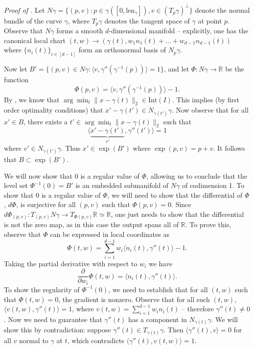 \documentclass[11pt]{article}
\begin{document}
\textit{Proof of .} Let $N\gamma = \{(p, v) : p \in \gamma([0, \text{len}_{\gamma}]), v \in (T_p \gamma)^{\bot}\}$ denote the normal bundle of the curve $\gamma$, where $T_p\gamma$ denotes the tangent space of $\gamma$ at point $p$. Observe that $N\gamma$ forms a smooth $d$-dimensional manifold -- explicitly, one has the canonical local chart $(t,w) \rightarrow (\gamma(t), w_1n_1(t) + \dots+w_{d-1}n_{d-1}(t))$ where $\{n_i(t)\}_{i\in [d-1]}$ form an orthonormal basis of $N_p\gamma$. 

Now let $B'= \{(p,v) \in N\gamma : \langle v,  \gamma''(\gamma^{-1}(p))\rangle = 1\}$, and let $\Phi:N\gamma \rightarrow \mathbb{R}$ be the function
\[\Phi(p,v) = \langle v, \gamma''(\gamma^{-1}(p))\rangle - 1.\]
By , we know that $\arg \min_t\|x - \gamma(t)\|_2 \in \text{Int}(I)$. This implies (by first order optimality conditions) that $x' - \gamma(t') \in N_{\gamma(t')}\gamma$. Now observe that for all $x' \in B$, there exists a $t' \in \arg\min_t \|x-\gamma(t)\|_2$ such that \[\langle \underbrace{x' - \gamma(t')}_{v'}, \gamma''(t')\rangle = 1\] where $v' \in N_{\gamma(t')}\gamma$. Thus $x' \in \exp(B')$ where $\exp(p,v) = p + v$. It follows that $B\subset \exp(B')$.

We will now show that $0$ is a regular value of $\Phi$, allowing us to conclude that the level set $\Phi^{-1}(0) = B'$ is an embedded submanifold of $N\gamma$ of codimension 1. To show that $0$ is a regular value of $\Phi$, we will need to show that the differential of $\Phi$, $d\Phi$, is surjective for all $(p,v)$ such that $\Phi(p,v) = 0$. Since $d\Phi_{(p,v)}: T_{(p,v)}N\gamma \rightarrow T_{\Phi(p,v)}\mathbb{R} \simeq\mathbb{R}$, one just needs to show that the differential is not the zero map, as in this case the output spans all of $\mathbb{R}$. To prove this, observe that $\Phi$ can be expressed in local coordinates as
\[\Phi(t,w) = \sum_{i = 1}^{d-1}w_i\langle n_i(t), \gamma''(t)\rangle - 1.\]
Taking the partial derivative with respect to $w_i$ we have
\[\frac{\partial}{\partial w_i}\Phi(t,w) = \langle n_i(t), \gamma''(t)\rangle.\]
To show the regularity of $\Phi^{-1}(0)$, we need to establish that for all $(t,w)$ such that $\Phi(t,w) = 0$, the gradient is nonzero. Observe that for all such $(t,w)$, $\langle v(t,w), \gamma''(t)\rangle = 1$, where $v(t,w) = \sum_{i = 1}^{d-1}w_in_{i}(t)$ -- therefore $\gamma''(t) \neq 0$. Now we need to guarantee that $\gamma''(t)$ has a component in $N_{\gamma(t)}\gamma$. We will show this by contradiction: suppose $\gamma''(t) \in T_{\gamma(t)}\gamma$. Then $\langle\gamma''(t), v\rangle = 0$ for all $v$ normal to $\gamma$ at $t$, which contradicts $\langle \gamma''(t), v(t,w) \rangle = 1$.
\end{document}

